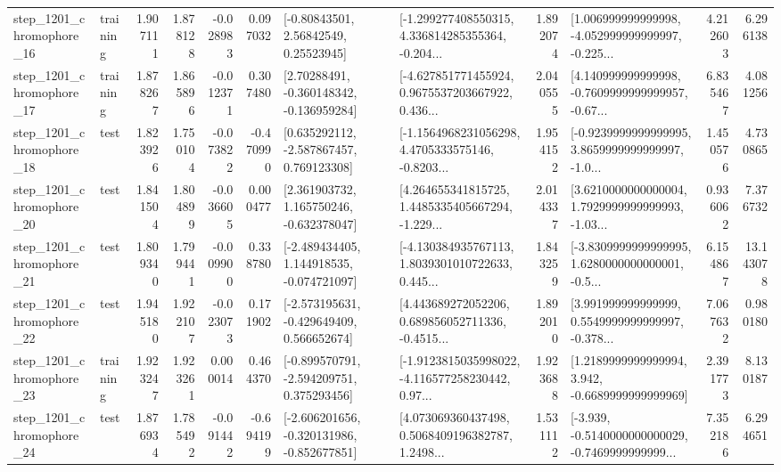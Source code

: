 \begin{tabular}{llrrrrllrlrr}
 step\_1201\_chromophore\_16 &  training &      1.907111 &    1.878128 &     -0.028983 &  0.097032 &       [-0.80843501, 2.56842549, 0.25523945] &  [-1.299277408550315, 4.336814285355364, -0.204... &       1.892074 &  [1.006999999999998, -4.052999999999997, -0.225... &            4.212603 &          6.296138 \\
 step\_1201\_chromophore\_17 &  training &      1.878267 &    1.865896 &     -0.012371 &  0.307480 &    [2.70288491, -0.360148342, -0.136959284] &  [-4.627851771455924, 0.9675537203667922, 0.436... &       2.040555 &  [4.140999999999998, -0.7609999999999957, -0.67... &            6.835467 &          4.081256 \\
 step\_1201\_chromophore\_18 &      test &      1.823926 &    1.750104 &     -0.073822 & -0.470990 &    [0.635292112, -2.587867457, 0.769123308] &  [-1.1564968231056298, 4.4705333575146, -0.8203... &       1.954152 &  [-0.9239999999999995, 3.8659999999999997, -1.0... &            1.450576 &          4.730865 \\
 step\_1201\_chromophore\_20 &      test &      1.841504 &    1.804899 &     -0.036605 &  0.000477 &    [2.361903732, 1.165750246, -0.632378047] &  [4.264655341815725, 1.4485335405667294, -1.229... &       2.014337 &  [3.6210000000000004, 1.7929999999999993, -1.03... &            0.936062 &          7.376732 \\
 step\_1201\_chromophore\_21 &      test &      1.809340 &    1.799441 &     -0.009900 &  0.338780 &   [-2.489434405, 1.144918535, -0.074721097] &  [-4.130384935767113, 1.8039301010722633, 0.445... &       1.843259 &  [-3.8309999999999995, 1.6280000000000001, -0.5... &            6.154867 &         13.143078 \\
 step\_1201\_chromophore\_22 &      test &      1.945180 &    1.922107 &     -0.023073 &  0.171902 &   [-2.573195631, -0.429649409, 0.566652674] &  [4.443689272052206, 0.689856052711336, -0.4515... &       1.892010 &  [3.991999999999999, 0.5549999999999997, -0.378... &            7.067632 &          0.980180 \\
 step\_1201\_chromophore\_23 &  training &      1.923247 &    1.923261 &      0.000014 &  0.464370 &   [-0.899570791, -2.594209751, 0.375293456] &  [-1.9123815035998022, -4.116577258230442, 0.97... &       1.923688 &   [1.2189999999999994, 3.942, -0.6689999999999969] &            2.391773 &          8.130187 \\
 step\_1201\_chromophore\_24 &      test &      1.876934 &    1.785492 &     -0.091442 & -0.694199 &  [-2.606201656, -0.320131986, -0.852677851] &  [4.073069360437498, 0.5068409196382787, 1.2498... &       1.531112 &  [-3.939, -0.5140000000000029, -0.7469999999999... &            7.352186 &          6.294651 \\

\end{tabular}
